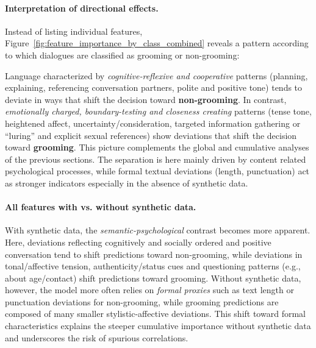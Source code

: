 \paragraph{Interpretation of directional effects.}
Instead of listing individual features, Figure~\ref{fig:feature_importance_by_class_combined} reveals a pattern according to which dialogues are classified as grooming or non-grooming:

Language characterized by \emph{cognitive-reflexive and cooperative} patterns (planning, explaining, referencing conversation partners, polite and positive tone) tends to deviate in ways that shift the decision toward \textbf{non-grooming}. In contrast, \emph{emotionally charged, boundary-testing and closeness creating} patterns (tense tone, heightened affect, uncertainty/consideration, targeted information gathering or “luring” and explicit sexual references) show deviations that shift the decision toward \textbf{grooming}. This picture complements the global and cumulative analyses of the previous sections. The separation is here mainly driven by content related psychological processes, while formal textual deviations (length, punctuation) act as stronger indicators especially in the absence of synthetic data.

\paragraph{All features with vs. without synthetic data.}
With synthetic data, the \emph{semantic-psychological} contrast becomes more apparent. Here, deviations reflecting cognitively and socially ordered and positive conversation tend to shift predictions toward non-grooming, while deviations in tonal/affective tension, authenticity/status cues and questioning patterns (e.g., about age/contact) shift predictions toward grooming. Without synthetic data, however, the model more often relies on \emph{formal proxies} such as text length or punctuation deviations for non-grooming, while grooming predictions are composed of many smaller stylistic-affective deviations. This shift toward formal characteristics explains the steeper cumulative importance without synthetic data and underscores the risk of spurious correlations.

